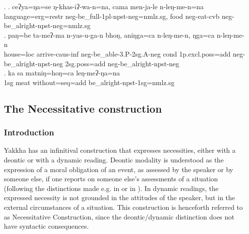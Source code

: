 \ex. \ag. ceʔya=ŋa=se ŋ-khas-iʔ-wa-n=na, cama men-ja-le n-leŋ-me-n=na\\
		language{\sc =erg=restr} {\sc neg}-be\_full-{\sc 1pl-npst-neg=nmlz.sg}, food	 {\sc neg-}eat{\sc -cvb}	{\sc neg-}be\_alright{\sc [3sg]-npst-neg=nmlz.sg}	\\ 
\bg. paŋ=be     ta-meʔ-ma           n-yas-u-ga-n bhoŋ,  aniŋga=ca n-leŋ-me-n, ŋga=ca n-leŋ-me-n\\
	house{\sc =loc} arrive{\sc -caus-inf} {\sc neg-}be\_able-{\sc 3.P-2sg.A-neg} {\sc cond} {\sc 1p.excl.poss=add} {\sc neg}-be\_alright{\sc [3sg]-npst-neg} {\sc 2sg.poss=add} {\sc neg}-be\_alright{\sc [3sg]-npst-neg} 	\\
	 
	\bg. ka sa matniŋ=hoŋ=ca leŋ-meʔ-ŋa=na\\
{\sc 1sg} meat without{\sc =seq=add} be\_alright{\sc -npst-1sg=nmlz.sg}\\



\subsection{The Necessitative construction}\label{obl}

\subsubsection{Introduction}
Yakkha has an infinitival construction that expresses necessities, either with a deontic or with a dynamic reading. Deontic modality is understood as the expression of a moral obligation of an event, as assessed by the speaker or by someone else, if one reports on someone else's assessments of a situation (following the distinctions made e.g. in \citet[2]{Nuyts2006_Modality} or in \citet[12]{Vanlinden2012_Modal}). In  dynamic readings, the expressed necessity is not grounded in the attitudes of the speaker, but in the external circumstances of a situation.  This construction is henceforth referred to as Necessitative Construction, since the deontic/dynamic distinction does not have syntactic consequences.

